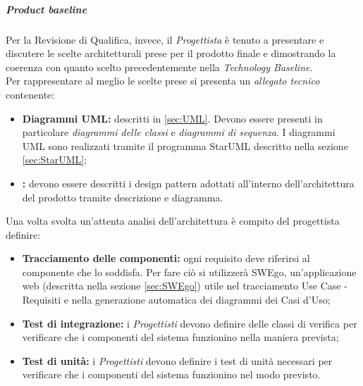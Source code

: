 			\subparagraph{Product baseline}
			\label{sec:prod}
			\Spazio
			Per la Revisione di Qualifica, invece, il \emph{Progettista} è tenuto a presentare e discutere le scelte architetturali prese per il prodotto finale e dimostrando la coerenza con quanto scelto precedentemente nella \textit{Technology Baseline}.\\
			Per rappresentare al meglio le scelte prese si presenta un \emph{allegato tecnico} contenente:
				\begin{itemize}
					\item \textbf{Diagrammi UML:} descritti in \ref{sec:UML}. Devono essere presenti in particolare \emph{diagrammi delle classi} e \emph{diagrammi di sequenza}.
					I diagrammi UML sono realizzati tramite il programma StarUML descritto nella sezione \ref{sec:StarUML};
					\item \textbf{:}
					devono essere descritti i design pattern adottati all'interno dell'architettura del prodotto tramite descrizione e diagramma.
				\end{itemize}
		   Una volta svolta un'attenta analisi dell'architettura è compito del progettista definire:
		   \begin{itemize}
		   	\item \textbf{Tracciamento delle componenti:}
		   	ogni requisito deve riferirsi al componente che lo soddisfa. Per fare ciò si utilizzerà SWEgo, un'applicazione web (descritta nella sezione \ref{sec:SWEgo}) utile nel tracciamento Use Case - Requisiti e nella generazione automatica dei diagrammi dei Casi d'Uso;
		   	\item \textbf{Test di integrazione:}
		   	i \emph{Progettisti} devono definire delle classi di verifica per verificare che i componenti del sistema funzionino nella maniera prevista;	
		   	\item \textbf{Test di unità:}
		   	i \emph{Progettisti} devono definire i test di unità necessari per verificare che i componenti del sistema funzionino nel modo previsto.
		   \end{itemize}
		
